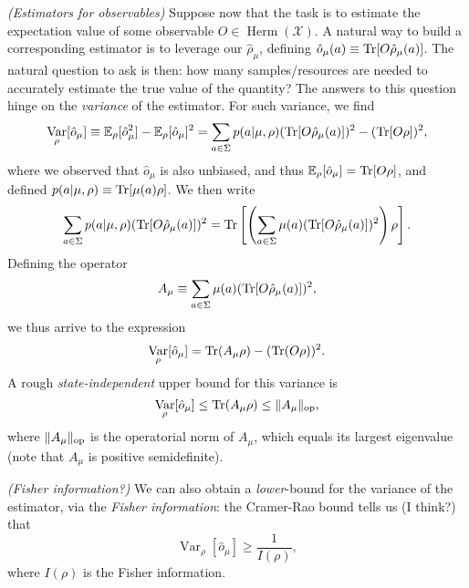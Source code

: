 \documentclass[12pt]{report}
\newcommand{\EE}{\mathbb{E}}
\newcommand{\calX}{{\mathcal{X}}}
\newcommand{\heading}[1]{{\color{Mahogany}\emph{(#1)}}}
\DeclareMathOperator{\Var}{Var}
\DeclareMathOperator{\Herm}{Herm}
\begin{document}
\heading{Estimators for observables}
Suppose now that the task is to estimate the expectation value of some observable $O\in\Herm(\calX)$.
A natural way to build a corresponding estimator is to leverage our $\hat\rho_\mu$, defining $\hat o_\mu(a)\equiv \Tr[O \hat\rho_\mu(a)]$.
The natural question to ask is then: how many samples/resources are needed to accurately estimate the true value of the quantity?
The answers to this question hinge on the \emph{variance} of the estimator.
For such variance, we find
\begin{equation}
	\Var_\rho[\hat o_\mu] \equiv
	\EE_\rho[\hat o_\mu^2] - \EE_\rho[\hat o_\mu]^2 =
	\sum_{a\in \Sigma} p(a|\mu,\rho) (\Tr[O \hat\rho_\mu(a)])^2
	- (\Tr[O\rho])^2,
\end{equation}
where we observed that $\hat o_\mu$ is also unbiased, and thus $\EE_\rho[\hat o_\mu]=\Tr[O\rho]$, and defined
$p(a|\mu,\rho)\equiv \Tr[\mu(a) \rho]$.
We then write
\begin{equation}
	\sum_{a\in \Sigma} p(a|\mu,\rho) (\Tr[O \hat\rho_\mu(a)])^2 =
	\Tr\left[
		\left( \sum_{a\in\Sigma} \mu(a) (\Tr[O \hat\rho_\mu(a)])^2 \right)
	\rho\right].
\end{equation}
Defining the operator
\begin{equation}
	A_\mu \equiv \sum_{a\in\Sigma} \mu(a)
	(\Tr[O\hat\rho_\mu(a)])^2,
\end{equation}
we thus arrive to the expression
\begin{equation}
	\Var_\rho[\hat o_\mu] =
	\Tr(A_\mu \rho) - (\Tr(O\rho))^2.
\end{equation}
A rough \emph{state-independent} upper bound for this variance is
\begin{equation}
	\Var_\rho[\hat o_\mu] \le
	\Tr(A_\mu \rho) \le \|A_\mu\|_{\rm op},
\end{equation}
where $\|A_\mu\|_{\rm op}$ is the operatorial norm of $A_\mu$, which equals its largest eigenvalue (note that $A_\mu$ is positive semidefinite).

\heading{Fisher information?}
We can also obtain a \emph{lower}-bound for the variance of the estimator, via the \emph{Fisher information}: the Cramer-Rao bound tells us (I think?) that
\begin{equation}
	\Var_\rho[\hat o_\mu] \ge \frac{1}{I(\rho)},
\end{equation}
where $I(\rho)$ is the Fisher information.
\end{document}
